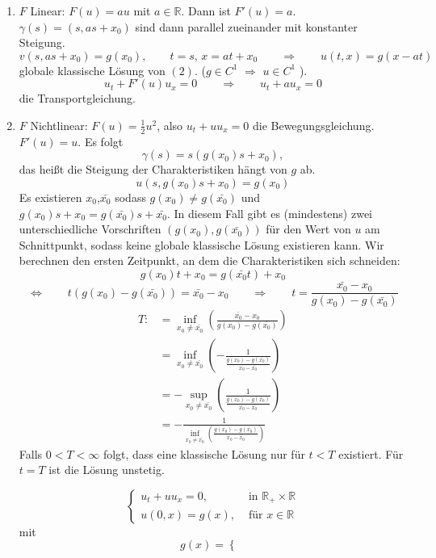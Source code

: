 \begin{enumerate}[1.)]
	\item $F$ Linear: $F(u) = au$ mit $a \in \mathbb{R}$. Dann ist $F'(u) = a$.
	$\gamma(s)=(s,as+x_0)$ sind dann parallel zueinander mit konstanter Steigung.
	\[
		v(s,as+x_0) = g(x_0), \qquad t=s, \, x=at+x_0 \qquad \Rightarrow \qquad u(t,x) = g(x-at)
	\]
	globale klassische Lösung von $(2)$. ($g \in C^1$ $\Rightarrow$ $u \in C^1$ ). \\
	\[
		u_t + F'(u) u_x =0 \qquad \Rightarrow \qquad u_t+ a u_x =0 
	\]
	die Transportgleichung.
	\item $F$ Nichtlinear: $F(u)= \frac{1}{2} u^2$, also $u_t + u u_x = 0$ die Bewegungsgleichung. $F'(u)=u$. Es folgt
	\[
		\gamma(s) = s(g(x_0)s+x_0),
	\]
 	das heißt die Steigung der Charakteristiken hängt von $g$ ab.
	\[
		u(s,g(x_0)s+x_0) = g(x_0)
	\]
	Es existieren $x_0$,$\bar{x_0}$ sodass $g(x_0) \neq g(\bar{x_0})$ und $g(x_0)s+ x_0 = g(\bar{x_0})s + \bar{x_0}$. In diesem Fall gibt es (mindestens) zwei unterschiedliche Vorschriften $(g(x_0),g(\bar{x_0}))$ für den Wert von $u$ am Schnittpunkt, sodass keine globale klassische Lösung existieren kann. Wir berechnen den ersten Zeitpunkt, an dem die Charakteristiken sich schneiden:
	\[
		g(x_0)t + x_0 = g(\bar{x_0}t)+ x_0
	\]
	\[
		\Leftrightarrow \qquad t(g(x_0)-g(\bar{x_0})) = \bar{x_0}-x_0 \qquad \Rightarrow \qquad t = \frac{\bar{x_0}-x_0}{g(x_0)-g(\bar{x_0})}
	\]
	\begin{align*}
		T:&= \inf_{x_0 \neq \bar{x_0}} \left( \frac{\bar{x_0}-x_0}{g(x_0)-g(\bar{x_0})} \right) \\
		&= \inf_{x_0 \neq \bar{x_0}} \left( - \frac{1}{\frac{g(x_0)- g(\bar{x_0})}{x_0-\bar{x_0}}} \right) \\
		& = - \sup_{x_0 \neq \bar{x_0}} \left( \frac{1}{\frac{g(x_0)-g(\bar{x_0})}{x_0-\bar{x_0}}} \right) \\
		&= - \frac{1}{\inf_{x_0 \neq \bar{x_0}}\left( \frac{g(x_0)-g(\bar{x_0})}{x_0-\bar{x_0}} \right)}
	\end{align*}
	Falls $0 < T < \infty$ folgt, dass eine klassische Lösung nur für $t < T$ existiert. Für $t=T$ ist die Lösung unstetig.
	\begin{beispiel}
		\[
			\begin{cases}
				u_t + uu_x = 0, &\text{ in }\mathbb{R}_+ \times \mathbb{R}\\
				u(0,x) = g(x), & \text{ für } x \in \mathbb{R}
			\end{cases}
		\]
		mit
		\[
			g(x) = \begin{cases}

\end{cases}\]
\end{beispiel}
\end{enumerate}
